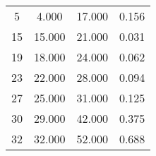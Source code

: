 % 
\begin{tabular}{cccc}
  \hline
  \hline
5 & 4.000 & 17.000 & 0.156 \\ 
  15 & 15.000 & 21.000 & 0.031 \\ 
  19 & 18.000 & 24.000 & 0.062 \\ 
  23 & 22.000 & 28.000 & 0.094 \\ 
  27 & 25.000 & 31.000 & 0.125 \\ 
  30 & 29.000 & 42.000 & 0.375 \\ 
  32 & 32.000 & 52.000 & 0.688 \\ 
   \hline
\end{tabular}
